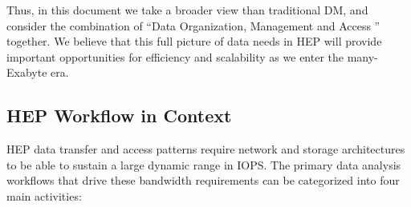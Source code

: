 \documentclass[12pt,a4paper]{article}
\begin{document}
Thus, in this document we take a broader view than traditional DM,
and consider the combination of ``Data Organization, Management and
Access '' together. We believe that this full picture of data
needs in HEP will provide important opportunities for efficiency and
scalability as we enter the many-Exabyte era.

\subsection{HEP Workflow in Context}\label{hep-workflow-in-context}

HEP data transfer and access patterns require network and storage architectures to be able to sustain a large dynamic range in IOPS. The primary data analysis workflows that drive
these bandwidth requirements can be categorized into four main
activities:
\end{document}
